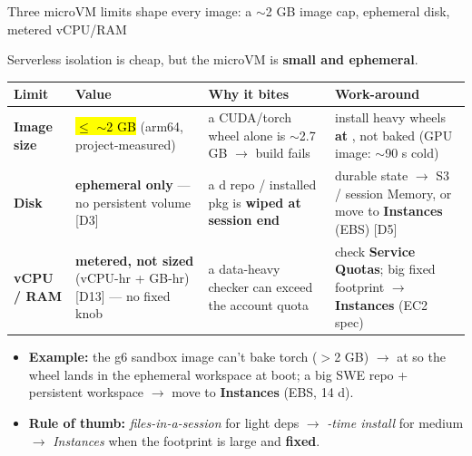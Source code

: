 \begin{frame}{Three microVM limits shape every image: a $\sim$2 GB image cap, ephemeral disk, metered vCPU/RAM}
{\footnotesize Serverless isolation is cheap, but the microVM is \textbf{small and ephemeral}.\par}
\vspace{1mm}
\scriptsize\setlength{\tabcolsep}{4pt}
\begin{tabularx}{\textwidth}{@{}p{1.3cm} >{\raggedright\arraybackslash}p{3.2cm} Y Y@{}}
\toprule
\textbf{Limit} & \textbf{Value} & \textbf{Why it bites} & \textbf{Work-around}\\
\midrule
\textbf{Image size} & \hl{$\le$ $\sim$2 GB} (arm64, project-measured) & a CUDA/torch wheel alone is $\sim$2.7 GB $\rightarrow$ build fails & install heavy wheels \textbf{at }, not baked (GPU image: $\sim$90 s cold)\\
\textbf{Disk} & \textbf{ephemeral only} --- no persistent volume [D3] & a d repo / installed pkg is \textbf{wiped at session end} & durable state $\rightarrow$ S3 / session Memory, or move to \textbf{Instances} (EBS) [D5]\\
\textbf{vCPU / RAM} & \textbf{metered, not sized} (vCPU-hr + GB-hr) [D13] --- no fixed knob & a data-heavy checker can exceed the account quota & check \textbf{Service Quotas}; big fixed footprint $\rightarrow$ \textbf{Instances} (EC2 spec)\\
\bottomrule
\end{tabularx}
\par\vspace{2mm}
\begin{itemize}\scriptsize\setlength{\itemsep}{0.8mm}
\item \textbf{Example:} the g6 sandbox image can't bake torch ($>$2 GB) $\rightarrow$  at  so the wheel lands in the ephemeral workspace at boot; a big SWE repo + persistent workspace $\rightarrow$ move to \textbf{Instances} (EBS, 14 d).
\item \textbf{Rule of thumb:} \emph{files-in-a-session} for light deps $\rightarrow$ \emph{-time install} for medium $\rightarrow$ \emph{Instances} when the footprint is large and \textbf{fixed}.
\end{itemize}
\end{frame}

